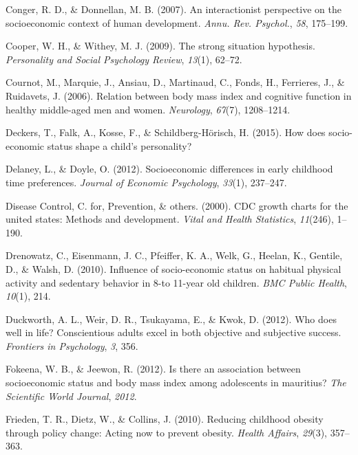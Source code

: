 \documentclass[man]{apa6}
\begin{document}
\leavevmode\hypertarget{ref-conger2007interactionist}{}%
Conger, R. D., \& Donnellan, M. B. (2007). An interactionist perspective on the socioeconomic context of human development. \emph{Annu. Rev. Psychol.}, \emph{58}, 175--199.

\leavevmode\hypertarget{ref-cooper2009strong}{}%
Cooper, W. H., \& Withey, M. J. (2009). The strong situation hypothesis. \emph{Personality and Social Psychology Review}, \emph{13}(1), 62--72.

\leavevmode\hypertarget{ref-cournot2006relation}{}%
Cournot, M., Marquie, J., Ansiau, D., Martinaud, C., Fonds, H., Ferrieres, J., \& Ruidavets, J. (2006). Relation between body mass index and cognitive function in healthy middle-aged men and women. \emph{Neurology}, \emph{67}(7), 1208--1214.

\leavevmode\hypertarget{ref-deckers2015does}{}%
Deckers, T., Falk, A., Kosse, F., \& Schildberg-Hörisch, H. (2015). How does socio-economic status shape a child's personality?

\leavevmode\hypertarget{ref-delaney2012socioeconomic}{}%
Delaney, L., \& Doyle, O. (2012). Socioeconomic differences in early childhood time preferences. \emph{Journal of Economic Psychology}, \emph{33}(1), 237--247.

\leavevmode\hypertarget{ref-centers2000cdc}{}%
Disease Control, C. for, Prevention, \& others. (2000). CDC growth charts for the united states: Methods and development. \emph{Vital and Health Statistics}, \emph{11}(246), 1--190.

\leavevmode\hypertarget{ref-drenowatz2010influence}{}%
Drenowatz, C., Eisenmann, J. C., Pfeiffer, K. A., Welk, G., Heelan, K., Gentile, D., \& Walsh, D. (2010). Influence of socio-economic status on habitual physical activity and sedentary behavior in 8-to 11-year old children. \emph{BMC Public Health}, \emph{10}(1), 214.

\leavevmode\hypertarget{ref-duckworth2012does}{}%
Duckworth, A. L., Weir, D. R., Tsukayama, E., \& Kwok, D. (2012). Who does well in life? Conscientious adults excel in both objective and subjective success. \emph{Frontiers in Psychology}, \emph{3}, 356.

\leavevmode\hypertarget{ref-fokeena2012there}{}%
Fokeena, W. B., \& Jeewon, R. (2012). Is there an association between socioeconomic status and body mass index among adolescents in mauritius? \emph{The Scientific World Journal}, \emph{2012}.

\leavevmode\hypertarget{ref-frieden2010reducing}{}%
Frieden, T. R., Dietz, W., \& Collins, J. (2010). Reducing childhood obesity through policy change: Acting now to prevent obesity. \emph{Health Affairs}, \emph{29}(3), 357--363.
\end{document}
